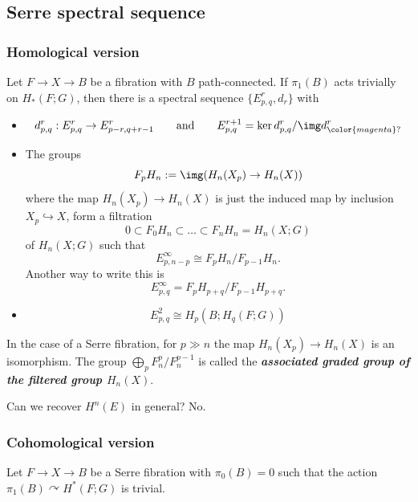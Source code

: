\begin{remark}
\begin{defn}
\subsection{Serre spectral sequence}

\subsubsection{Homological version}

\begin{thm}
	Let $F\to X\to B$ be a fibration with $B$ path-connected. If $\pi_1(B)$ acts trivially on $H_*(F;G)$, then there is a spectral sequence $\{E^r_{p,q},d_r\}$ with
	\begin{itemize}
		\item
			\[d^r_{p,q}:E^r_{p,q}\to E^r_{p-r,q+r-1}\qquad \text{and} \qquad E^{r+1}_{p,q}=\ker d^r_{p,q}/\img d^r_{{\color{magenta}?}}\]
		\item The groups
			\[F_pH_n:=\img(H_n(X_p)\to H_n(X))\]
		where the map $H_{n}(X_p)\to H_{n}(X)$ is just the induced map by inclusion $X_p\hookrightarrow X$, form a filtration
		\[0\subset F_0H_n\subset \ldots\subset F_nH_n=H_n(X;G)\]
		of $H_n(X;G)$ such that
		\[E^\infty_{p,n-p}\cong F_pH_n/F_{p-1}H_n.\]
		Another way to write this is
		\[E_{p,q}^\infty=F_pH_{p+q}\Big/F_{p-1}H_{p+q}.\]
	\item \[E^2_{p,q}\cong H_p(B;H_q(F;G))\]
\end{itemize}
\end{thm}

\begin{remark}
	In the case of a Serre fibration, for $p\gg n$ the map $H_{n}(X_p)\to H_{n}(X)$ is an isomorphism. The group $\bigoplus_{p}F^p_n/F^{p-1}_n$ is called the \textit{\textbf{associated graded group of the filtered group $H_n(X)$}}.
\end{remark}

\begin{question}
	Can we recover $H^{n}(E)$ in general? No.
\end{question}

\subsubsection{Cohomological version}

\begin{thm}
	Let $F\to X\to B$ be a Serre fibration with $\pi_0(B)=0$ such that the action $\pi_1(B)\curvearrowright H^*(F;G)$ is trivial.


\end{thm}
\end{defn}
\end{remark}
